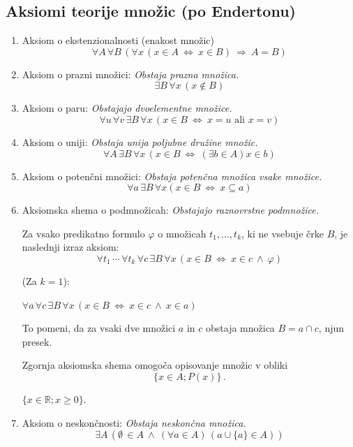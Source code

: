 \documentclass[11pt,paper=b5,footinclude,headinclude]{scrbook} %
\newcounter{example}
\def\inn {{~\wedge~}}
\def\sledi {{~\Rightarrow~}}
\def\cee {{~\Leftrightarrow~}}
\begin{document}
\subsection{Aksiomi teorije množic (po Endertonu)}

\begin{enumerate}
  \item Aksiom o ekstenzionalnosti (enakost množic)
  $$\forall A\, \forall B\, (\forall x \,(x\in A \cee x\in B) \sledi A = B)$$

  \item Aksiom o prazni množici:
  \emph{ Obstaja prazna množica.}
  $$\exists B\, \forall x\, (x\not \in B)$$

  \item Aksiom o paru: \emph{ Obstajajo dvoelementne množice.}
    $$\forall u\, \forall v\, \exists B\, \forall x\, (x\in B \cee x = u\textrm{ ali }x = v)$$

  \item Aksiom o uniji: \emph{ Obstaja unija poljubne družine množic.}
    $$\forall A\, \exists B\, \forall x\, (x\in B \cee (\exists b\in A) x\in b)$$

  \item Aksiom o potenčni množici: \emph{ Obstaja potenčna množica vsake množice.}
    $$\forall a\, \exists B\, \forall x (x\in B \cee x\subseteq a)$$

  \item Aksiomska shema o podmnožicah: \emph{ Obstajajo raznovrstne podmnožice.}

  Za vsako predikatno formulo $\varphi$ o množicah $t_1,\ldots, t_k$, ki ne vsebuje črke $B$, je naslednji izraz aksiom:
$$\forall t_1\,\cdots\, \forall t_k\,\forall c\,\exists B \,\forall x \,(x\in B \cee x\in c \inn \varphi)$$

\begin{example*}
(Za $k = 1$):

$\forall a \,\forall c \,\exists B \, \forall x\, (x\in B \cee x\in c \inn x\in a)$

To pomeni, da za vsaki dve množici $a$ in $c$ obstaja množica $B = a\cap c$, njun presek.
\end{example*}
\medskip
Zgornja aksiomska shema omogoča opisovanje množic v obliki
$$\{x\in A; P(x)\}\,.$$

\begin{example*}
$\{x\in \mathbb{R}; x\ge 0\}$.
\end{example*}

  \item Aksiom o neskončnosti: \emph{ Obstaja neskončna množica.}
$$\exists A\,(\emptyset \,\in A \inn (\forall a\in A)\, (a\cup \{a\}\in A))$$


\end{enumerate}
\end{document}
